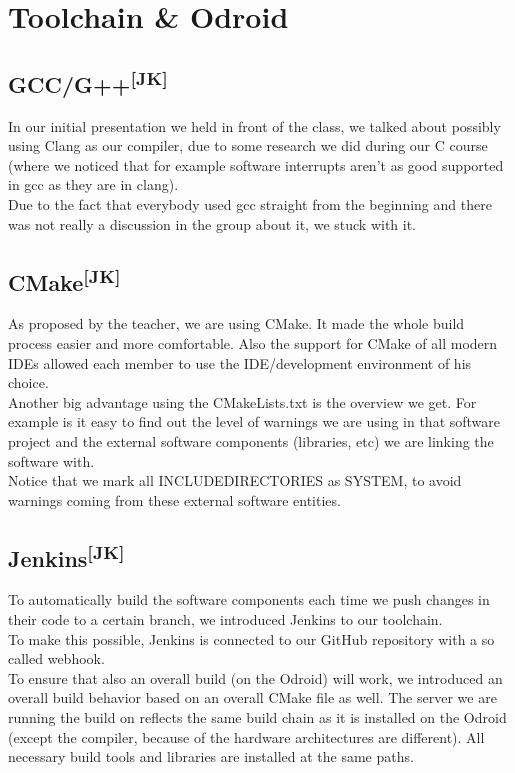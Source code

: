 \chapter{Toolchain \& Odroid}
\section[GCC/G++]{GCC/G++\textsuperscript{[JK]}}
In our initial presentation we held in front of the class, we talked about
possibly using Clang as our compiler, due to some research we did during our C
course (where we noticed that for example software interrupts aren't as good
supported in gcc as they are in clang).\\
Due to the fact that everybody used gcc straight from the beginning and there
was not really a discussion in the group about it, we stuck with it.

\section[CMake]{CMake\textsuperscript{[JK]}}
As proposed by the teacher, we are using CMake. It made the whole build process
easier and more comfortable. Also the support for CMake of all modern IDEs
allowed each member to use the IDE/development environment of his choice.\\
Another big advantage using the CMakeLists.txt is the overview we get. For
example is it easy to find out the level of warnings we are using in that
software project and the external software components (libraries, etc) we are
linking the software with.\\
Notice that we mark all INCLUDE\textunderscore DIRECTORIES as SYSTEM, to avoid
warnings coming from these external software entities.

\section[Jenkins]{Jenkins\textsuperscript{[JK]}}
To automatically build the software components each time we push changes in
their code to a certain branch, we introduced Jenkins to our toolchain.\\
To make this possible, Jenkins is connected to our GitHub repository with a so
called webhook.\\
To ensure that also an overall build (on the Odroid) will work, we introduced an
overall build behavior based on an overall CMake file as well. The server we are
running the build on reflects the same build chain as it is installed on the
Odroid (except the compiler, because of the hardware architectures are
different). All necessary build tools and libraries are installed at the same
paths.


